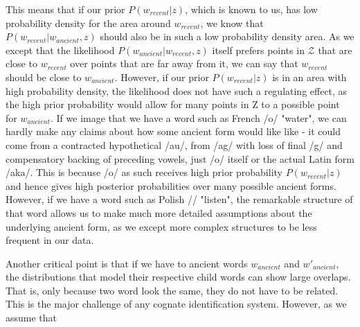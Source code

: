 \documentclass[8pt]{article}
\begin{document}
This means that if our prior $P(w_{recent}|z)$, which is known to us, has low probability density for the area around $w_{recent}$, we know that $P(w_{recent}|w_{ancient},z)$ should also be in such a low probability density area. As we except that the likelihood  $P(w_{ancient}|w_{recent},z)$ itself prefers points in $\mathcal{Z}$ that are close to $w_{recent}$ over points that are far away from it, we can say that $w_{recent}$ should be close to $w_{ancient}$. 
However, if our prior $P(w_{recent}|z)$ is in an area with high probability density, the likelihood does not have such a regulating effect, as the high prior probability would allow for many points in Z to a possible point for $w_{ancient}$. If we image that we have a word such as French /o/ "water", we can hardly make any claims about how some ancient form would like like - it could come from a contracted hypothetical /au/, from /ag/ with loss of final /g/ and compensatory backing of preceding vowels, just /o/ itself or the actual Latin form /aka/. This is because /o/ as such receives high prior probability $P(w_{recent}|z)$ and hence gives high posterior probabilities over many possible ancient forms. However, if we have a word such as Polish // "listen", the remarkable structure of that word allows us to make much more detailed assumptions about the underlying ancient form, as we except more complex structures to be less frequent in our data.


% 
%
%

Another critical point is that if we have to ancient words $w_{ancient}$ and $w'_{ancient}$, the distributions that model their respective  child words can show large overlaps. That is, only because two word look the same, they do not have to be related. This is the major challenge of any cognate identification system. However, as we assume that 
\end{document}
